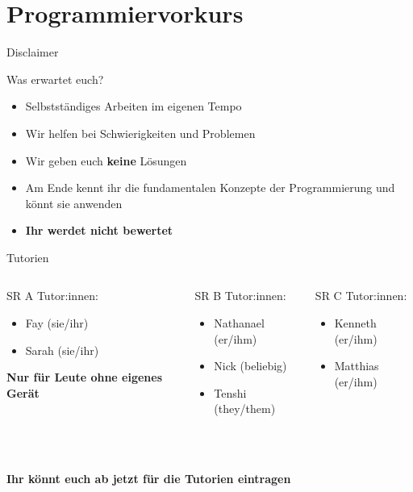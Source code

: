 \documentclass[t,aspectratio=1610, 12pt]{beamer} %
\begin{document}
\section{Programmiervorkurs}

\begin{frame}{Disclaimer}
	\begin{block}{Was erwartet euch?}
		\begin{itemize}
			\item Selbstständiges Arbeiten im eigenen Tempo
			\item Wir helfen bei Schwierigkeiten und Problemen
			\item Wir geben euch \textbf{keine} Lösungen
			\item Am Ende kennt ihr die fundamentalen Konzepte der Programmierung und könnt sie anwenden
			\item \textbf{Ihr werdet nicht bewertet}			
		\end{itemize}
	\end{block}
\end{frame}

\begin{frame}{Tutorien}
	\begin{columns}
		\begin{column}{.3\textwidth}
			\begin{block}{SR A}
				Tutor:innen:
				\begin{itemize}
					\item Fay (sie/ihr)
					\item Sarah (sie/ihr)
				\end{itemize}
				\textbf{Nur für Leute ohne eigenes Gerät}
			\end{block}
		\end{column}
		\begin{column}{.3\textwidth}
			\begin{block}{SR B}
				Tutor:innen:
				\begin{itemize}
					\item Nathanael (er/ihm)
					\item Nick (beliebig)
					\item Tenshi (they/them)
				\end{itemize}
			\end{block}
		\end{column}
		\begin{column}{.3\textwidth}
			\begin{block}{SR C}
				Tutor:innen:
				\begin{itemize}
					\item Kenneth (er/ihm)
					\item Matthias (er/ihm)
				\end{itemize}
			\end{block}
		\end{column}
	\end{columns}
	~\\
	~\\
	\centering\textbf{Ihr könnt euch ab jetzt für die Tutorien eintragen}
\end{frame}
\end{document}
